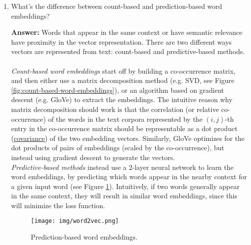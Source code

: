 \documentclass{article}
\newenvironment{QandA}{\begin{enumerate}[label=\arabic*.]}{\end{enumerate}}
\newenvironment{InnerQandA}{\begin{enumerate}[label=\roman*.]}{\end{enumerate}}
\newenvironment{answer}{\par\normalfont \textbf{Answer:}}{}
\begin{document}
\begin{QandA}
\begin{InnerQandA}
        \item What’s the difference between count-based and prediction-based word embeddings?
        \begin{answer}
            Words that appear in the same context or have semantic relevance have proximity in the vector representation. There are two different ways vectors are represented from text: count-based and predictive-based methods.\\\\
            \textit{Count-based word embeddings} start off by building a co-occurrence matrix, and then either use a matrix decomposition method (e.g. SVD, see Figure \ref{fig:count-based-word-embeddings}), or an algorithm based on gradient descent (e.g. GloVe) to extract the embeddings. The intuitive reason why matrix decomposition should work is that the correlation (or relative co-occurrence) of the words in the text corpora represented by the $(i,j)$-th entry in the co-occurrence matrix should be representable as a dot product (\href{https://www.quora.com/Is-there-any-relation-between-correlation-of-two-signals-and-dot-product-of-two-vectors}{covariance}) of the two embedding vectors. Similarly, GloVe optimizes for the dot products of pairs of embeddings (scaled by the co-occurrence), but instead using gradient descent to generate the vectors. \\
            
            
            \noindent \textit{Predictive-based methods} instead use a 2-layer neural network to learn the word embeddings, by predicting which words appear in the nearby context for a given input word (see Figure \ref{fig:prediction-based-word-embeddings}). Intuitively, if two words generally appear in the same context, they will result in similar word embeddings, since this will minimize the loss function.

            \begin{figure}[h!]
                \centering
                \texttt{[image: img/word2vec.png]}
                \caption{Prediction-based word embeddings\footnotemark.}
                \label{fig:prediction-based-word-embeddings}
            \end{figure}
        \end{answer}


\end{InnerQandA}
\end{QandA}
\end{document}
